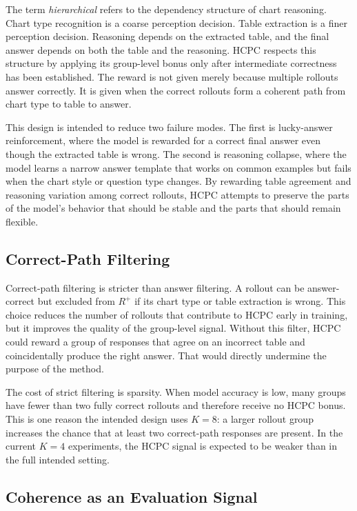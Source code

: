 \documentclass{iutbscthesis}
\begin{document}
The term \emph{hierarchical} refers to the dependency structure of chart reasoning. Chart type recognition is a coarse perception decision. Table extraction is a finer perception decision. Reasoning depends on the extracted table, and the final answer depends on both the table and the reasoning. HCPC respects this structure by applying its group-level bonus only after intermediate correctness has been established. The reward is not given merely because multiple rollouts answer correctly. It is given when the correct rollouts form a coherent path from chart type to table to answer.

This design is intended to reduce two failure modes. The first is lucky-answer reinforcement, where the model is rewarded for a correct final answer even though the extracted table is wrong. The second is reasoning collapse, where the model learns a narrow answer template that works on common examples but fails when the chart style or question type changes. By rewarding table agreement and reasoning variation among correct rollouts, HCPC attempts to preserve the parts of the model's behavior that should be stable and the parts that should remain flexible.

\subsection{Correct-Path Filtering}

Correct-path filtering is stricter than answer filtering. A rollout can be answer-correct but excluded from $R^+$ if its chart type or table extraction is wrong. This choice reduces the number of rollouts that contribute to HCPC early in training, but it improves the quality of the group-level signal. Without this filter, HCPC could reward a group of responses that agree on an incorrect table and coincidentally produce the right answer. That would directly undermine the purpose of the method.

The cost of strict filtering is sparsity. When model accuracy is low, many groups have fewer than two fully correct rollouts and therefore receive no HCPC bonus. This is one reason the intended design uses $K=8$: a larger rollout group increases the chance that at least two correct-path responses are present. In the current $K=4$ experiments, the HCPC signal is expected to be weaker than in the full intended setting.

\subsection{Coherence as an Evaluation Signal}
\end{document}
